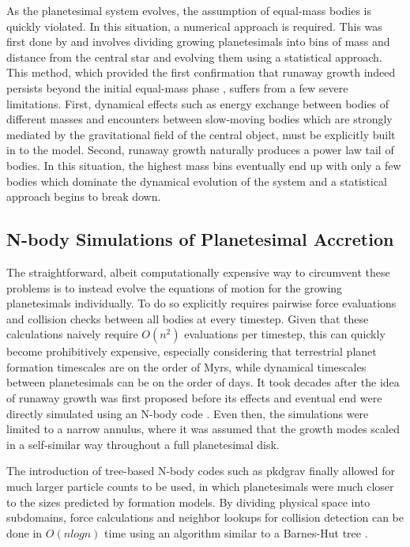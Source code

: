 As the planetesimal system evolves, the assumption of equal-mass bodies is quickly violated. In this situation, a numerical approach is required. This was first done by \cite{greenberg78} and involves dividing growing planetesimals into bins of mass and distance from the central star and evolving them using a statistical approach. This method, which provided the first confirmation that runaway growth indeed persists beyond the initial equal-mass phase \cite{wetherill89}, suffers from a few severe limitations. First, dynamical effects such as energy exchange between bodies of different masses and encounters between slow-moving bodies which are strongly mediated by the gravitational field of the central object, must be explicitly built in to the model. Second, runaway growth naturally produces a power law tail of bodies. In this situation, the highest mass bins eventually end up with only a few bodies which dominate the dynamical evolution of the system and a statistical approach begins to break down.

\subsection{N-body Simulations of Planetesimal Accretion} \label{sec:nbodyPl}

The straightforward, albeit computationally expensive way to circumvent these problems is to instead evolve the equations of motion for the growing planetesimals individually. To do so explicitly requires pairwise force evaluations and collision checks between all bodies at every timestep. Given that these calculations naively require $O(n^2)$ evaluations per timestep, this can quickly become prohibitively expensive, especially considering that terrestrial planet formation timescales are on the order of Myrs, while dynamical timescales between planetesimals can be on the order of days. It took decades after the idea of runaway growth was first proposed before its effects and eventual end were directly simulated using an N-body code \cite{kokubo96, kokubo98}. Even then, the simulations were limited to a narrow annulus, where it was assumed that the growth modes scaled in a self-similar way throughout a full planetesimal disk.

The introduction of tree-based N-body codes such as {\sc pkdgrav} \cite{richardson00, stadel01, wadsley04} finally allowed for much larger particle counts to be used, in which planetesimals were much closer to the sizes predicted by formation models. By dividing physical space into subdomains, force calculations and neighbor lookups for collision detection can be done in $O (n log n)$ time using an algorithm similar to a Barnes-Hut tree \cite{barnes86}. 


